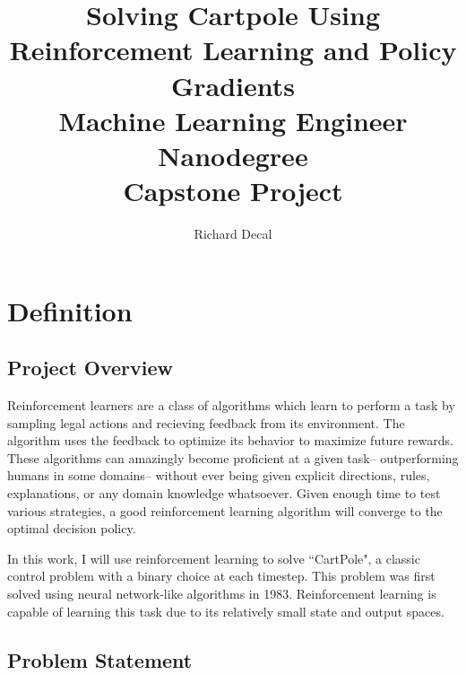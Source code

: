 \documentclass[12pt,a4paper]{article}
\author{Richard Decal}
\title{%
  Solving Cartpole Using Reinforcement Learning and Policy Gradients \\
  \large Machine Learning Engineer Nanodegree\\
  Capstone Project}
\begin{document}
\maketitle


\section{Definition}

\subsection*{Project Overview}

Reinforcement learners are a class of algorithms which learn to perform a task by sampling legal actions and recieving feedback from its environment. The algorithm uses the feedback to optimize its behavior to maximize future rewards. These algorithms can amazingly become proficient at a given task-- outperforming humans in some domains-- without ever being given explicit directions, rules, explanations, or any domain knowledge whatsoever. Given enough time to test various strategies, a good reinforcement learning algorithm will converge to the optimal decision policy.

In this work, I will use reinforcement learning to solve ``CartPole", a classic control problem with a binary choice at each timestep. This problem was first solved using neural network-like algorithms in 1983.\cite{og_cartpole} Reinforcement learning is capable of learning this task due to its relatively small state and output spaces.\cite{deep_pg}\cite{ddpg_blog}

\subsection*{Problem Statement}
\end{document}
